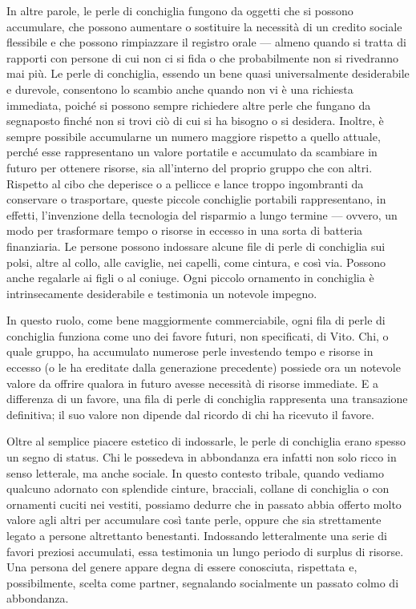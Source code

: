 \documentclass[
  a5paper,
  smalldemyvopaper,10pt,twoside,onecolumn,openright,extrafontsizes,hidelinks]{memoir}
\begin{document}
In altre parole, le perle di conchiglia fungono da oggetti che si
possono accumulare, che possono aumentare o sostituire la necessità di
un credito sociale flessibile e che possono rimpiazzare il registro
orale --- almeno quando si tratta di rapporti con persone di cui non ci
si fida o che probabilmente non si rivedranno mai più. Le perle di
conchiglia, essendo un bene quasi universalmente desiderabile e
durevole, consentono lo scambio anche quando non vi è una richiesta
immediata, poiché si possono sempre richiedere altre perle che fungano
da segnaposto finché non si trovi ciò di cui si ha bisogno o si
desidera. Inoltre, è sempre possibile accumularne un numero maggiore
rispetto a quello attuale, perché esse rappresentano un valore portatile
e accumulato da scambiare in futuro per ottenere risorse, sia
all'interno del proprio gruppo che con altri. Rispetto al cibo che
deperisce o a pellicce e lance troppo ingombranti da conservare o
trasportare, queste piccole conchiglie portabili rappresentano, in
effetti, l'invenzione della tecnologia del risparmio a lungo termine ---
ovvero, un modo per trasformare tempo o risorse in eccesso in una sorta
di batteria finanziaria. Le persone possono indossare alcune file di
perle di conchiglia sui polsi, altre al collo, alle caviglie, nei
capelli, come cintura, e così via. Possono anche regalarle ai figli o al
coniuge. Ogni piccolo ornamento in conchiglia è intrinsecamente
desiderabile e testimonia un notevole impegno.

In questo ruolo, come bene maggiormente commerciabile, ogni fila di
perle di conchiglia funziona come uno dei favore futuri, non
specificati, di Vito. Chi, o quale gruppo, ha accumulato numerose perle
investendo tempo e risorse in eccesso (o le ha ereditate dalla
generazione precedente) possiede ora un notevole valore da offrire
qualora in futuro avesse necessità di risorse immediate. E a differenza
di un favore, una fila di perle di conchiglia rappresenta una
transazione definitiva; il suo valore non dipende dal ricordo di chi ha
ricevuto il favore.

Oltre al semplice piacere estetico di indossarle, le perle di conchiglia
erano spesso un segno di status. Chi le possedeva in abbondanza era
infatti non solo ricco in senso letterale, ma anche sociale. In questo
contesto tribale, quando vediamo qualcuno adornato con splendide
cinture, bracciali, collane di conchiglia o con ornamenti cuciti nei
vestiti, possiamo dedurre che in passato abbia offerto molto valore agli
altri per accumulare così tante perle, oppure che sia strettamente
legato a persone altrettanto benestanti. Indossando letteralmente una
serie di favori preziosi accumulati, essa testimonia un lungo periodo di
surplus di risorse. Una persona del genere appare degna di essere
conosciuta, rispettata e, possibilmente, scelta come partner, segnalando
socialmente un passato colmo di abbondanza.
\end{document}
